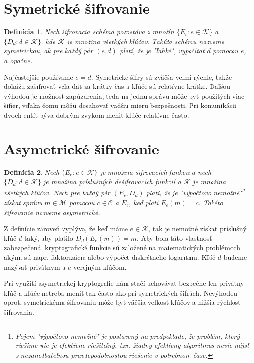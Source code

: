 \newtheorem{mydef}{Definícia}
\section{Symetrické šifrovanie}
\begin{mydef}
	Nech šifrovacia schéma pozostáva z množín $\{E_e : e \in\mathcal K\}$ a $\{D_d: d \in\mathcal K\}$, kde $\mathcal K$ je množina všetkých kľúčov. Takúto schému nazveme symetrickou, ak pre každý pár $(e,d)$ platí, že je "ľahké", vypočítať $d$ pomocou $e$, a opačne. 
\end{mydef}
	Najčastejšie používame $e = d$. Symetrické šifry sú zväčša veľmi rýchle, takže dokážu zašifrovať veľa dát za krátky čas a kľúče sú relatívne krátke. Ďaľšou výhodou je možnosť zapúzdrenia, teda na jednu správu môže byť použitých viac šifier, vďaka čomu môžu dosahovať vačšiu mieru bezpečnosti. Pri komunikácii dvoch entít býva dobrým zvykom meniť kľúče relatívne často.

\section{Asymetrické šifrovanie}
\begin{mydef}
	Nech $\{E_e : e \in\mathcal K\}$ je množina šifrovacích funkcií a nech  $\{D_d : d \in\mathcal K\}$ je množina príslušných dešifrovacích funkcií a $\mathcal K$ je množina všetkých kľúčov. Nech pre každý pár $(E_e,D_d)$ platí, že je "výpočtovo nemožné"\footnote{Pojem "výpočtovo nemožné" je postavený na predpoklade, že problém, ktorý riešime nie je efektívne riešiteľný, tzn. žiadny efektívny algoritmus nevie nájsť s nezanedbateľnou pravdepodobnosťou riešenie v potrebnom čase.} získať správu $m \in\mathcal M$ pomocou $c \in\mathcal C$ a $E_e$, keď platí $E_e(m) = c$. Takéto šifrovanie nazveme asymetrické.
\end{mydef}
	Z definície zároveň vyplýva, že keď máme $e \in\mathcal K$, tak je nemožné získat príslušný kľúč $d$ taký, aby platilo $D_d(E_e(m)) = m$. Aby bola táto vlastnosť zabezpečená, kryptografické funkcie sú založené na matematických problémoch akými sú napr. faktorizácia alebo výpočet diskrétneho logaritmu. Kľúč $d$ budeme nazývať privátnym a $e$ verejným kľúčom. 
	
	Pri využití asymetrickej kryptografie nám stačí uchovávať bezpečne len privátny kľúč a kľúče netreba meniť tak často ako pri symetrických šifrách. Nevýhodou oproti symetrickému šifrovaniu môže byť väčšia veľkosť kľúčov a nižšia rýchlosť šifrovania.
		

